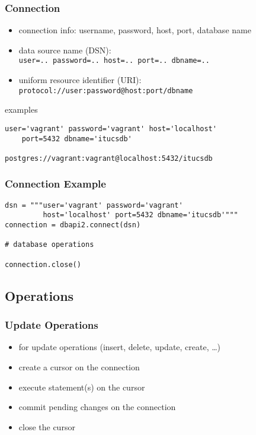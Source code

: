 \documentclass[dvipsnames]{beamer}
\theoremstyle{plain}
\begin{document}
\begin{frame}[fragile]
  \frametitle{Connection}

  \begin{itemize}
    \item connection info: username, password, host, port, database name

    \medskip
    \item data source name (DSN):\\
      \texttt{user=.. password=.. host=.. port=.. dbname=..}
    \item uniform resource identifier (URI):\\
      \texttt{protocol://user:password@host:port/dbname}
  \end{itemize}

  \medskip
  \begin{exampleblock}{examples}
    \begin{lstlisting}
user='vagrant' password='vagrant' host='localhost'
    port=5432 dbname='itucsdb'

postgres://vagrant:vagrant@localhost:5432/itucsdb
    \end{lstlisting}
  \end{exampleblock}
\end{frame}

\begin{frame}[fragile]
  \frametitle{Connection Example}

  \begin{lstlisting}
dsn = """user='vagrant' password='vagrant'
         host='localhost' port=5432 dbname='itucsdb'"""
connection = dbapi2.connect(dsn)

# database operations

connection.close()
  \end{lstlisting}
\end{frame}

\subsection{Operations}

\begin{frame}
  \frametitle{Update Operations}

  \begin{itemize}
    \item for update operations (insert, delete, update, create, \ldots)

    \bigskip
    \item create a cursor on the connection
    \item execute statement(s) on the cursor
    \item commit pending changes on the connection
    \item close the cursor
  \end{itemize}
\end{frame}
\end{document}
